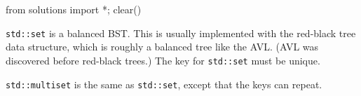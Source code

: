 \begin{python0}
from solutions import *; clear()
\end{python0}

\verb!std::set! is a balanced BST. This is usually implemented
with the red-black tree data structure, which is roughly a balanced
tree like the AVL. (AVL was discovered before red-black trees.)
The key for \verb!std::set! must be unique.



\verb!std::multiset! is the same as \verb!std::set!,
except that the keys can repeat.
